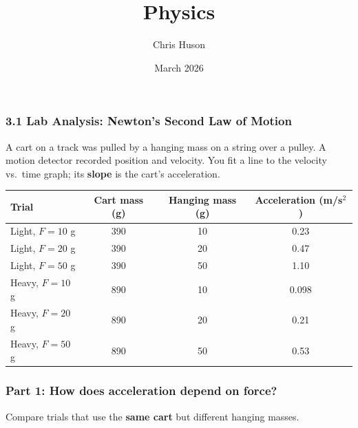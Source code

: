 \documentclass[12pt, twoside]{article}
\title{Physics}
\author{Chris Huson}
\date{March 2026}
\begin{document}
\subsubsection*{3.1 Lab Analysis: Newton's Second Law of Motion}

A cart on a track was pulled by a hanging mass on a string over a pulley. A motion detector recorded position and velocity. You fit a line to the velocity vs.\ time graph; its \textbf{slope} is the cart's acceleration.

\vspace{0.25cm}

\begin{center}
\begin{tabular}{|l|c|c|c|}
\hline
\textbf{Trial} & \textbf{Cart mass (g)} & \textbf{Hanging mass (g)} & \textbf{Acceleration (m/s$^2$)} \\
\hline
Light, $F = 10$ g & 390 & 10 & 0.23 \\
Light, $F = 20$ g & 390 & 20 & 0.47 \\
Light, $F = 50$ g & 390 & 50 & 1.10 \\
\hline
Heavy, $F = 10$ g & 890 & 10 & 0.098 \\
Heavy, $F = 20$ g & 890 & 20 & 0.21 \\
Heavy, $F = 50$ g & 890 & 50 & 0.53 \\
\hline
\end{tabular}
\end{center}

\subsubsection*{Part 1: How does acceleration depend on force?}

Compare trials that use the \textbf{same cart} but different hanging masses.
\end{document}
